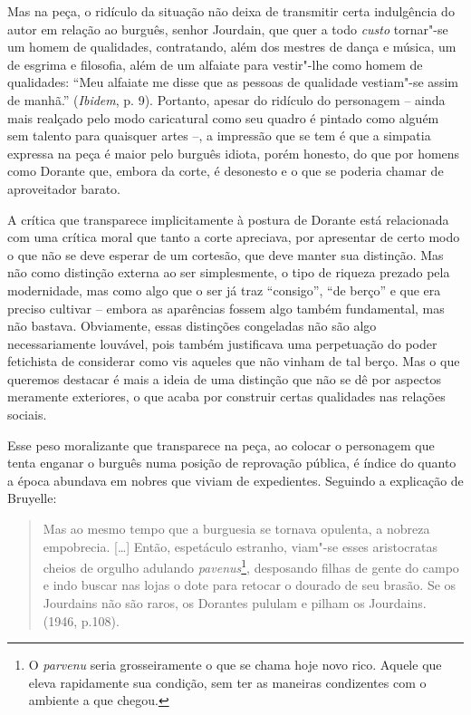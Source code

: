 Mas na peça, o ridículo da situação não deixa de transmitir certa
indulgência do autor em relação ao burguês, senhor Jourdain, que quer a
todo \emph{custo} tornar"-se um homem de qualidades, contratando, além
dos mestres de dança e música, um de esgrima e filosofia, além de um
alfaiate para vestir"-lhe como homem de qualidades: ``Meu alfaiate me
disse que as pessoas de qualidade vestiam"-se assim de manhã.''
(\emph{Ibidem}, p. 9). Portanto, apesar do ridículo do personagem --
ainda mais realçado pelo modo caricatural como seu quadro é pintado como
alguém sem talento para quaisquer artes --, a impressão que se tem é que
a simpatia expressa na peça é maior pelo burguês idiota, porém honesto,
do que por homens como Dorante que, embora da corte, é desonesto e o que
se poderia chamar de aproveitador barato.

A crítica que transparece implicitamente à postura de Dorante está
relacionada com uma crítica moral que tanto a corte apreciava, por
apresentar de certo modo o que não se deve esperar de um cortesão, que
deve manter sua distinção. Mas não como distinção externa ao ser
simplesmente, o tipo de riqueza prezado pela modernidade, mas como algo
que o ser já traz ``consigo'', ``de berço'' e que era preciso cultivar
-- embora as aparências fossem algo também fundamental, mas não bastava.
Obviamente, essas distinções congeladas não são algo necessariamente
louvável, pois também justificava uma perpetuação do poder fetichista de
considerar como vis aqueles que não vinham de tal berço. Mas o que
queremos destacar é mais a ideia de uma distinção que não se dê por
aspectos meramente exteriores, o que acaba por construir certas
qualidades nas relações sociais.

Esse peso moralizante que transparece na peça, ao colocar o personagem
que tenta enganar o burguês numa posição de reprovação pública, é índice
do quanto a época abundava em nobres que viviam de expedientes. Seguindo
a explicação de Bruyelle:

\begin{quote}
Mas ao mesmo tempo que a burguesia se tornava opulenta, a nobreza
empobrecia. [\ldots{}] Então, espetáculo estranho, viam"-se esses
aristocratas cheios de orgulho adulando \emph{pavenus}\footnote{O
  \emph{parvenu} seria grosseiramente o que se chama hoje novo rico.
  Aquele que eleva rapidamente sua condição, sem ter as maneiras
  condizentes com o ambiente a que chegou.}, desposando filhas de gente
do campo e indo buscar nas lojas o dote para retocar o dourado de seu
brasão. Se os Jourdains não são raros, os Dorantes pululam e pilham os
Jourdains. (1946, p.108).
\end{quote}

